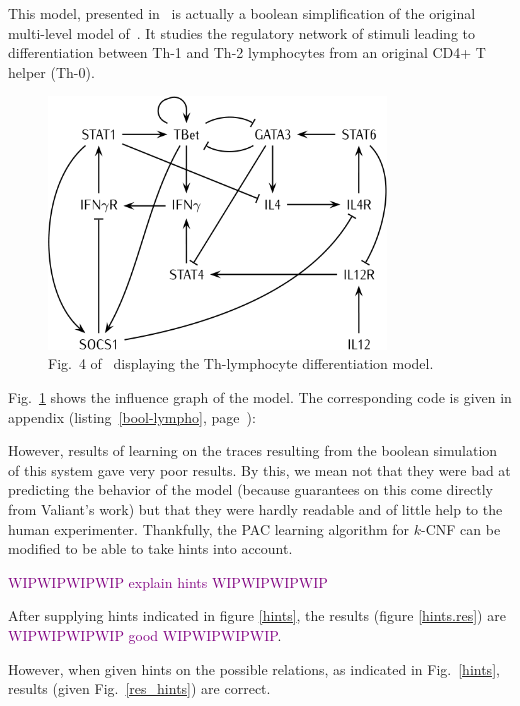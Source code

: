 \documentclass{llncs}
\newcommand{\wip}[1]{\textcolor{Purple}{WIPWIPWIPWIP #1 WIPWIPWIPWIP}}
\begin{document}
\begin{example}\label{ex:lympho}

   This model, presented in~\cite{RRMTC06tcsb} is actually a boolean
   simplification of the original multi-level model
   of~\cite{Mendoza06biosystems}. It studies the regulatory network of stimuli
   leading to differentiation between Th-1 and Th-2 lymphocytes from an
   original CD4+ T helper (Th-0).

   \begin{figure}[htbp]
   	\centering
      \includegraphics[width=0.8\textwidth]{th_net_clean.png}
      \caption{Fig.~4 of~\cite{RRMTC06tcsb} displaying the Th-lymphocyte
      differentiation model.\label{fig:lympho}}
   \end{figure}

   Fig.~\ref{fig:lympho} shows the influence graph of the model. The
   corresponding code is given in appendix (listing~\ref{bool-lympho}, page~\pageref{bool-lympho}):
\end{example}

However, results of learning on the traces resulting from the boolean simulation of this system gave very poor results. By this, we mean not that they were bad at predicting the behavior of the model (because guarantees on this come directly from Valiant's work) but that they were hardly readable and of little help to the human experimenter. Thankfully, the PAC learning algorithm for $k$-CNF can be modified to be able to take hints into account.

\wip{explain hints}

After supplying hints indicated in figure \ref{hints}, the results (figure \ref{hints.res}) are \wip{good}.
	

However, when given hints on the possible relations, as indicated in
Fig.~\ref{hints}, results (given Fig.~\ref{res_hints}) are correct.
\end{document}
